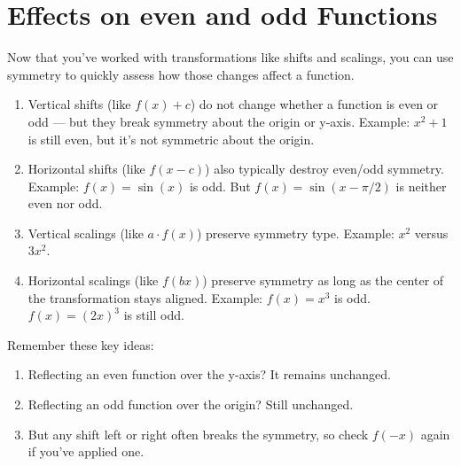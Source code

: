 \section{Effects on even and odd Functions}
Now that you've worked with transformations like shifts and scalings, you can use symmetry to quickly assess how those changes affect a function.
\begin{enumerate}
    \item Vertical shifts (like \( f(x) + c \)) do not change whether a function is even or odd — but they break symmetry about the origin or y-axis. Example: \( x^2 + 1 \) is still even, but it's not symmetric about the origin.
    \item Horizontal shifts (like \( f(x - c) \)) also typically destroy even/odd symmetry. Example: \( f(x) = \sin(x) \) is odd. But \( f(x) = \sin(x - \pi/2) \) is neither even nor odd.
    \item Vertical scalings (like \( a \cdot f(x) \)) preserve symmetry type. Example: \( x^2 \) versus \( 3x^2 \).
    \item Horizontal scalings (like \( f(bx) \)) preserve symmetry as long as the center of the transformation stays aligned. Example: \( f(x) = x^3 \) is odd. \( f(x) = (2x)^3 \) is still odd.
\end{enumerate}

Remember these key ideas:
\begin{enumerate}
    \item Reflecting an even function over the y-axis? It remains unchanged.
    \item Reflecting an odd function over the origin? Still unchanged.
    \item But any shift left or right often breaks the symmetry, so check \( f(-x) \) again if you've applied one.
\end{enumerate}

